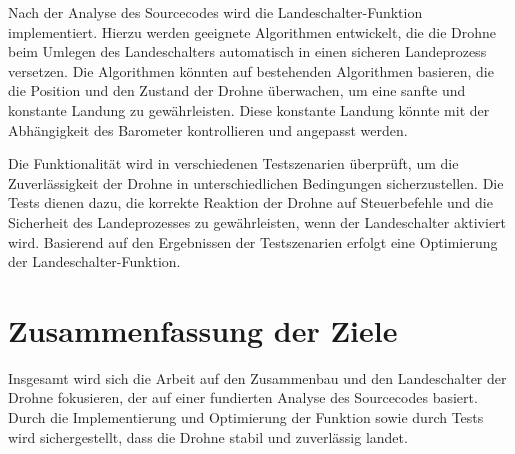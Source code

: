 Nach der Analyse des Sourcecodes wird die Landeschalter-Funktion implementiert. Hierzu werden geeignete Algorithmen entwickelt, die die Drohne beim Umlegen des Landeschalters automatisch in einen sicheren Landeprozess versetzen. Die Algorithmen könnten auf bestehenden Algorithmen basieren, die die Position und den Zustand der Drohne überwachen, um eine sanfte und konstante Landung zu gewährleisten. Diese konstante Landung könnte mit der Abhängigkeit des Barometer kontrollieren und angepasst werden.

Die Funktionalität wird in verschiedenen Testszenarien überprüft, um die Zuverlässigkeit der Drohne in unterschiedlichen Bedingungen sicherzustellen. Die Tests dienen dazu, die korrekte Reaktion der Drohne auf Steuerbefehle und die Sicherheit des Landeprozesses zu gewährleisten, wenn der Landeschalter aktiviert wird. Basierend auf den Ergebnissen der Testszenarien erfolgt eine  Optimierung der Landeschalter-Funktion.


\section{Zusammenfassung der Ziele}

Insgesamt wird sich die Arbeit auf den Zusammenbau und den Landeschalter der Drohne fokusieren, der auf einer fundierten Analyse des Sourcecodes basiert. Durch die Implementierung und Optimierung der Funktion sowie durch Tests wird sichergestellt, dass die Drohne stabil und zuverlässig landet.
